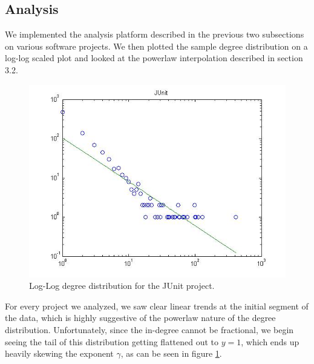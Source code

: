\documentclass[11pt,a4paper,twocolumn]{article}
\begin{document}
\begin{singlespace}
\subsection{Analysis}
We implemented the analysis platform described in the previous two subsections on
various software projects. We then plotted the sample degree distribution on a log-log 
scaled plot and looked at the powerlaw interpolation described in section 3.2. 
\begin{figure}
\centering
\caption{Log-Log degree distribution for the JUnit project.\label{fig:marsold}}
\includegraphics[scale=0.45]{images/marsold}
\end{figure}
For every project we analyzed, we saw clear linear trends at the initial segment of the
data, which is highly suggestive of the powerlaw nature of the degree distribution. 
Unfortunately, since the in-degree cannot be fractional, we begin seeing the tail 
of this distribution getting flattened out to $y = 1$, which ends up heavily skewing 
the exponent $\gamma$, as can be seen in figure \ref{fig:marsold}.


\end{singlespace}
\end{document}
